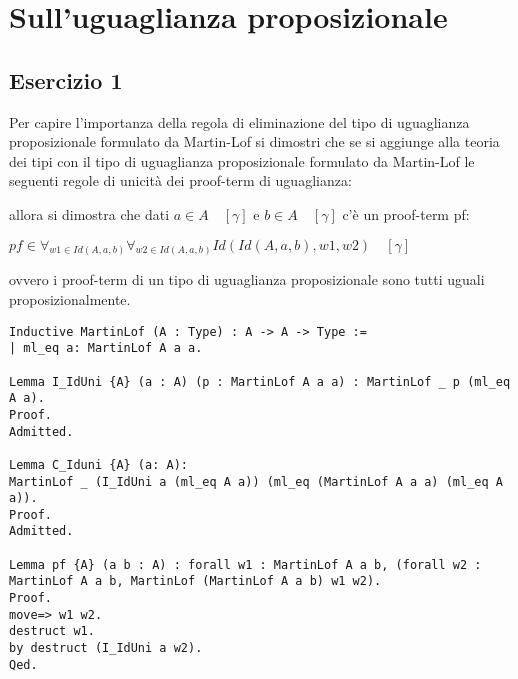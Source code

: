 \newpage
\section{Sull'uguaglianza proposizionale}

\subsection{Esercizio 1}

Per capire l'importanza della regola di eliminazione del tipo di uguaglianza
proposizionale formulato da Martin-Lof si dimostri che se si aggiunge alla
teoria dei tipi con il tipo di uguaglianza proposizionale formulato da
Martin-Lof le seguenti regole di unicità dei proof-term di uguaglianza:

\begin{prooftree}
\end{prooftree}

\begin{prooftree}
\end{prooftree}

allora si dimostra che dati $a \in A \quad [\gamma]$ e $b \in A \quad [\gamma]$ c'è un
proof-term pf: \\

\begin{center}
$pf \in \forall_{w1 \in Id(A, a, b)} \forall_{w2 \in Id(A, a, b)} Id(Id(A, a, b), w1, w2) \quad [\gamma]$
\end{center}

ovvero i proof-term di un tipo di uguaglianza proposizionale sono tutti uguali
proposizionalmente.

\begin{lstlisting}[language=Coq]
Inductive MartinLof (A : Type) : A -> A -> Type :=
| ml_eq a: MartinLof A a a.

Lemma I_IdUni {A} (a : A) (p : MartinLof A a a) : MartinLof _ p (ml_eq A a).
Proof.
Admitted.

Lemma C_Iduni {A} (a: A):
MartinLof _ (I_IdUni a (ml_eq A a)) (ml_eq (MartinLof A a a) (ml_eq A a)).
Proof.
Admitted.

Lemma pf {A} (a b : A) : forall w1 : MartinLof A a b, (forall w2 : MartinLof A a b, MartinLof (MartinLof A a b) w1 w2).
Proof.
move=> w1 w2.
destruct w1.
by destruct (I_IdUni a w2).
Qed.
\end{lstlisting}

